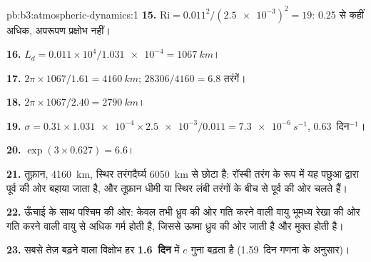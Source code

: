 \begin{solution}{pb:b3:atmospheric-dynamics:1}
\textbf{15.} $\mathrm{Ri} = 0.011^2/(\num{2.5e-3})^2 = 19$: 0.25 से कहीं अधिक,
अपरूपण प्रक्षोभ नहीं।

\textbf{16.} $L_d = 0.011\times10^4/\num{1.031e-4} = \qty{1067}{km}$।

\textbf{17.} $2\pi\times1067/1.61 = \qty{4160}{km}$; $28306/4160 = 6.8$
तरंगें।

\textbf{18.} $2\pi\times1067/2.40 = \qty{2790}{km}$।

\textbf{19.} $\sigma = 0.31\times\num{1.031e-4}\times\num{2.5e-3}/0.011 =
\qty{7.3e-6}{s^{-1}}$, \num{0.63}~दिन$^{-1}$।

\textbf{20.} $\exp(3\times0.627) = 6.6$।

\textbf{21.} तूफ़ान, \qty{4160}{km}, स्थिर
तरंगदैर्घ्य \qty{6050}{km} से छोटा है: रॉस्बी तरंग के रूप में यह पछुआ द्वारा
पूर्व की ओर बहाया जाता है, और तूफ़ान धीमी या स्थिर लंबी
तरंगों के बीच से पूर्व की ओर चलते हैं।

\textbf{22.} ऊँचाई के साथ पश्चिम की ओर: केवल तभी ध्रुव की ओर गति करने वाली वायु
भूमध्य रेखा की ओर गति करने वाली वायु से अधिक गर्म होती है, जिससे ऊष्मा ध्रुव की ओर जाती है और
 मुक्त होती है।

\textbf{23.} सबसे तेज़ बढ़ने वाला विक्षोभ हर
\textbf{\num[text-series-to-math=true]{1.6}~दिन} में $e$ गुना बढ़ता है (\num{1.59}~दिन
गणना के अनुसार)।
\end{solution}
